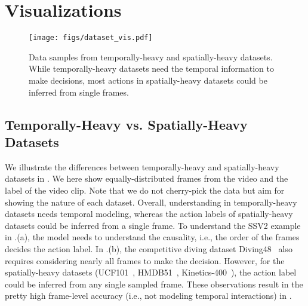 \section{Visualizations}
\label{sec:appen_visualization}

\begin{figure}[t]
\vskip 0.1in
\begin{center}
\texttt{[image: figs/dataset\_vis.pdf]}
                \vspace{-6pt}
\caption{
Data samples from temporally-heavy and spatially-heavy datasets.
While temporally-heavy datasets need the temporal information to make decisions, most actions in spatially-heavy datasets could be inferred from single frames.
}
\label{fig:dataset_vis}
\end{center}
\vspace{-10pt}
\end{figure}

\subsection{Temporally-Heavy vs. Spatially-Heavy Datasets}
\label{sec:append_dataset_visualization}
We illustrate the differences between temporally-heavy and spatially-heavy datasets in .
We here show equally-distributed frames from the video and the label of the video clip.
Note that we do not cherry-pick the data but aim for showing the nature of each dataset.
Overall, understanding in temporally-heavy datasets needs temporal modeling, whereas the action labels of spatially-heavy datasets could be inferred from a single frame.
To understand the SSV2\cite{goyal2017something} example in .(a), the model needs to understand the causality, i.e., the order of the frames decides the action label.
In .(b), the competitive diving dataset Diving48~\cite{li2018resound} also requires considering nearly all frames to make the decision.
However, for the spatially-heavy datasets (UCF101~\cite{soomro2012ucf101}, HMDB51~\cite{kuehne2011hmdb}, Kinetics-400~\cite{carreira2017quo}), the action label could be inferred from any single sampled frame. 
These observations result in the pretty high frame-level accuracy (i.e., not modeling temporal interactions) in .




